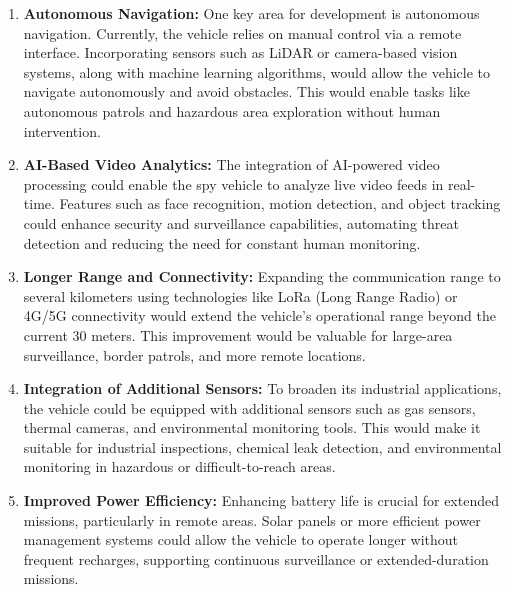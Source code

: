 \documentclass[12pt,a4paper]{report}
\begin{document}
\begin{enumerate}
    \item \textbf{Autonomous Navigation:} 
    One key area for development is autonomous navigation. Currently, the vehicle relies on manual control via a remote interface. Incorporating sensors such as LiDAR or camera-based vision systems, along with machine learning algorithms, would allow the vehicle to navigate autonomously and avoid obstacles. This would enable tasks like autonomous patrols and hazardous area exploration without human intervention.
    
    \item \textbf{AI-Based Video Analytics:} 
    The integration of AI-powered video processing could enable the spy vehicle to analyze live video feeds in real-time. Features such as face recognition, motion detection, and object tracking could enhance security and surveillance capabilities, automating threat detection and reducing the need for constant human monitoring.
    
    \item \textbf{Longer Range and Connectivity:} 
    Expanding the communication range to several kilometers using technologies like LoRa (Long Range Radio) or 4G/5G connectivity would extend the vehicle's operational range beyond the current 30 meters. This improvement would be valuable for large-area surveillance, border patrols, and more remote locations.
    
    \item \textbf{Integration of Additional Sensors:} 
    To broaden its industrial applications, the vehicle could be equipped with additional sensors such as gas sensors, thermal cameras, and environmental monitoring tools. This would make it suitable for industrial inspections, chemical leak detection, and environmental monitoring in hazardous or difficult-to-reach areas.
    
    \item \textbf{Improved Power Efficiency:} 
    Enhancing battery life is crucial for extended missions, particularly in remote areas. Solar panels or more efficient power management systems could allow the vehicle to operate longer without frequent recharges, supporting continuous surveillance or extended-duration missions.
\end{enumerate}







	\newpage



 
 

	
\end{document}
